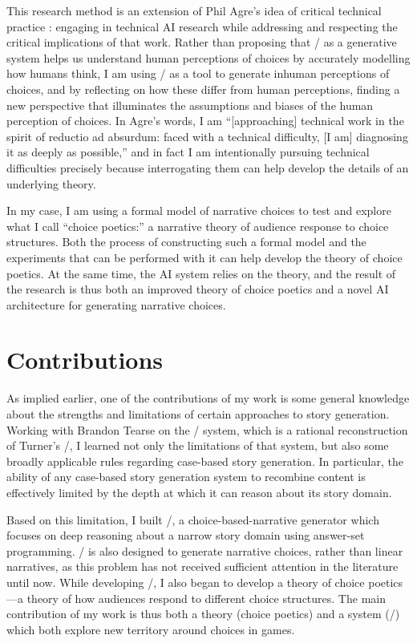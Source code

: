 This research method is an extension of Phil Agre's idea of critical technical practice \citep{Agre1997}: engaging in technical AI research while addressing and respecting the critical implications of that work.
%
Rather than proposing that \dunyazad/ as a generative system helps us understand human perceptions of choices by accurately modelling how humans think, I am using \dunyazad/ as a tool to generate inhuman perceptions of choices, and by reflecting on how these differ from human perceptions, finding a new perspective that illuminates the assumptions and biases of the human perception of choices.
%
In Agre's words, I am ``[approaching] technical work in the spirit of reductio ad absurdum: faced with a technical difficulty, [I am] diagnosing it as deeply as possible,'' \citep{Agre1997} and in fact I am intentionally pursuing technical difficulties precisely because interrogating them can help develop the details of an underlying theory.


In my case, I am using a formal model of narrative choices to test and explore what I call ``choice poetics:'' a narrative theory of audience response to choice structures.
%
Both the process of constructing such a formal model and the experiments that can be performed with it can help develop the theory of choice poetics.
%
At the same time, the AI system relies on the theory, and the result of the research is thus both an improved theory of choice poetics and a novel AI architecture for generating narrative choices.


\section{Contributions}

As implied earlier, one of the contributions of my work is some general knowledge about the strengths and limitations of certain approaches to story generation.
%
Working with Brandon Tearse on the \skald/ system, which is a rational reconstruction of Turner's \minstrel/, I learned not only the limitations of that system, but also some broadly applicable rules regarding case-based story generation.
%
In particular, the ability of any case-based story generation system to recombine content is effectively limited by the depth at which it can reason about its story domain.


Based on this limitation, I built \dunyazad/, a choice-based-narrative generator which focuses on deep reasoning about a narrow story domain using answer-set programming.
%
\dunyazad/ is also designed to generate narrative choices, rather than linear narratives, as this problem has not received sufficient attention in the literature until now.
%
While developing \dunyazad/, I also began to develop a theory of choice poetics---a theory of how audiences respond to different choice structures.
%
The main contribution of my work is thus both a theory (choice poetics) and a system (\dunyazad/) which both explore new territory around choices in games.


